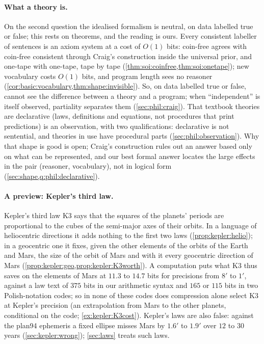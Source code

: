\paragraph{What a theory is.} On the second question the idealised formalism is neutral, on data labelled true or false; this rests on theorems, and the reading is ours. Every consistent labeller of sentences is an axiom system at a cost of $O(1)$ bits: coin-free \SAIabbr agrees with coin-free consistent \SOIabbr through Craig's construction inside the universal prior, and one-tape with one-tape, tape by tape (\cref{thm:soi:coinfree,thm:soi:onetape}); new vocabulary costs $O(1)$ bits, and program length sees no reasoner (\cref{cor:basic:vocabulary,thm:shape:invisible}). So, on data labelled true or false, \SAIabbr cannot see the difference between a theory and a program; when ``independent'' is itself observed, partiality separates them (\cref{sec:phil:craig}). That textbook theories are declarative (laws, definitions and equations, not procedures that print predictions) is an observation, with two qualifications: declarative is not sentential, and theories in use have procedural parts (\cref{sec:phil:observation}). Why that shape is good is open; Craig's construction rules out an answer based only on what can be represented, and our best formal answer locates the large effects in the pair (reasoner, vocabulary), not in logical form (\cref{sec:shape,q:phil:declarative}).

\paragraph{A preview: Kepler's third law.} Kepler's third law $\mathrm{K3}$ says that the squares of the planets' periods are proportional to the cubes of the semi-major axes of their orbits. In a language of heliocentric directions it adds nothing to the first two laws (\cref{prop:kepler:helio}); in a geocentric one it fixes, given the other elements of the orbits of the Earth and Mars, the size of the orbit of Mars and with it every geocentric direction of Mars (\cref{prop:kepler:geo,prop:kepler:K3worth}). A computation puts what $\mathrm{K3}$ thus saves on the elements of Mars at $11.3$ to $14.7$ bits for precisions from $8'$ to $1'$, against a law text of $375$ bits in our arithmetic syntax and $165$ or $115$ bits in two Polish-notation codes; so in none of these codes does compression alone select $\mathrm{K3}$ at Kepler's precision (an extrapolation from Mars to the other planets, conditional on the code; \cref{ex:kepler:K3cost}). Kepler's laws are also false: against the plan94 ephemeris a fixed ellipse misses Mars by $1.6'$ to $1.9'$ over $12$ to $30$ years (\cref{sec:kepler:wrong}); \cref{sec:laws} treats such laws.

